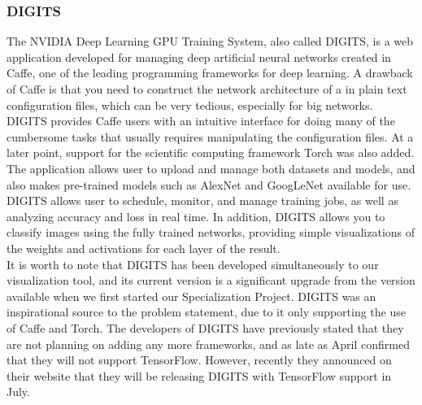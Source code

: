 \begin{comment}
Drawbacks:
- No managing of networks.
- No advanced visualizations.
\end{comment}

\subsubsection{DIGITS}

The NVIDIA Deep Learning GPU Training System, also called DIGITS, is a web application developed for managing deep artificial neural networks created in Caffe, one of the leading programming frameworks for deep learning. A drawback of Caffe is that you need to construct the network architecture of a in plain text configuration files, which can be very tedious, especially for big networks. DIGITS provides Caffe users with an intuitive interface for doing many of the cumbersome tasks that usually requires manipulating the configuration files. At a later point, support for the scientific computing framework Torch was also added. The application allows user to upload and manage both datasets and models, and also makes pre-trained models such as AlexNet and GoogLeNet available for use. DIGITS allows user to schedule, monitor, and manage training jobs, as well as analyzing accuracy and loss in real time. In addition, DIGITS allows you to classify images using the fully trained networks, providing simple visualizations of the weights and activations for each layer of the result. \\

\noindent It is worth to note that DIGITS has been developed simultaneously to our visualization tool, and its current version is a significant upgrade from the version available when we first started our Specialization Project. DIGITS was an inspirational source to the problem statement, due to it only supporting the use of Caffe and Torch. The developers of DIGITS have previously stated that they are not planning on adding any more frameworks, and as late as April confirmed that they will not support TensorFlow. However, recently they announced on their website that they will be releasing DIGITS with TensorFlow support in July.


\begin{comment}
Drawbacks:
- Still does not support Keras.
- No advanced visualizations.
\end{comment}

